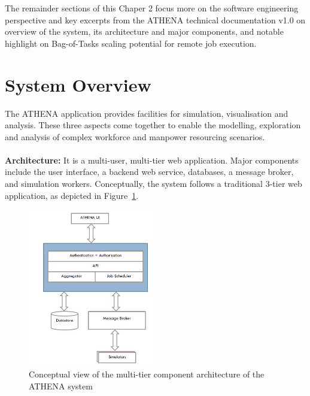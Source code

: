 The remainder sections of this Chaper 2 focus more on the software engineering perspective and key excerpts from the ATHENA technical documentation v1.0 \parencite{athenaTechDoc} on overview of the system, its architecture and major components, and notable highlight on Bag-of-Tasks scaling potential for remote job execution.

\section{System Overview}

The ATHENA application provides facilities for simulation, visualisation and analysis. These three aspects come together to enable the modelling, exploration and analysis of complex workforce and manpower resourcing scenarios.
\\
\\
\textbf{Architecture:} \quad It is a multi-user, multi-tier web application. Major components include the user interface, a backend web service, databases, a message broker, and simulation workers. Conceptually, the system follows a traditional 3-tier web application, as depicted in Figure~\ref{fig:conceptArch}. 

\begin{figure}
\centering
\includegraphics[width=0.5\textwidth]{Figures/ATHENA_conceptual_architecture}
\decoRule
\caption[ATHENA Conceptual Architecture]{Conceptual view of the multi-tier component architecture of the ATHENA system}
\label{fig:conceptArch}
\end{figure}

